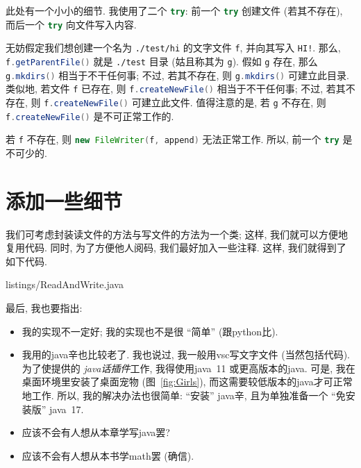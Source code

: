 此处有一个小小的细节.
我使用了二个 \lstinline[language=Java]`try`:
前一个 \lstinline[language=Java]`try` 创建文件 (若其不存在),
而后一个 \lstinline[language=Java]`try` 向文件写入内容.

无妨假定我们想创建一个名为 \verb`./test/hi`
的文字文件 \lstinline[language=Java]`f`,
并向其写入 \verb`HI!`.
那么, \lstinline[language=Java]`f.getParentFile()`
就是 \verb`./test` 目录
(姑且称其为 \lstinline[language=Java]`g`).
假如 \lstinline[language=Java]`g` 存在,
那么 \lstinline[language=Java]`g.mkdirs()`
相当于不干任何事;
不过, 若其不存在, 则 \lstinline[language=Java]`g.mkdirs()`
可建立此目录.
类似地, 若文件 \lstinline[language=Java]`f` 已存在,
则 \lstinline[language=Java]`f.createNewFile()`
相当于不干任何事;
不过, 若其不存在,
则 \lstinline[language=Java]`f.createNewFile()`
可建立此文件.
值得注意的是, 若 \lstinline[language=Java]`g` 不存在,
则 \lstinline[language=Java]`f.createNewFile()`
是不可正常工作的.

若 \lstinline[language=Java]`f` 不存在,
则 \lstinline[language=Java]`new FileWriter(f, append)`
无法正常工作.
所以, 前一个 \lstinline[language=Java]`try` 是不可少的.

\section{添加一些细节}

我们可考虑封装读文件的方法与写文件的方法为一个类;
这样, 我们就可以方便地复用代码.
同时, 为了方便他人阅码, 我们最好加入一些注释.
这样, 我们就得到了如下代码.


{listings/ReadAndWrite.java}

最后, 我也要指出:
\begin{itemize}
    \item 我的实现不一定好;
          我的实现也不是很 ``简单'' (跟\gls{python}比).
    \item 我用的\gls{java}辛也比较老了.
          我也说过, 我一般用\gls{vsc}写文字文件 (当然包括代码).
          为了使提供的%
          \emph{\gls{java}话插件}工作,
          我得使用\gls{java}~11 或更高版本的\gls{java}.
          可是, 我在桌面环境里安装了桌面宠物 (图~\ref{fig:Girls}),
          而这需要较低版本的\gls{java}才可正常地工作.
          所以, 我的解决办法也很简单:
          ``安装'' \gls{java}辛,
          且为单独准备一个
          ``免安装版'' \gls{java}~17.
    \item 应该不会有人想从本章学写\gls{java}罢?
    \item 应该不会有人想从本书学\gls{math}罢 (确信).
\end{itemize}

